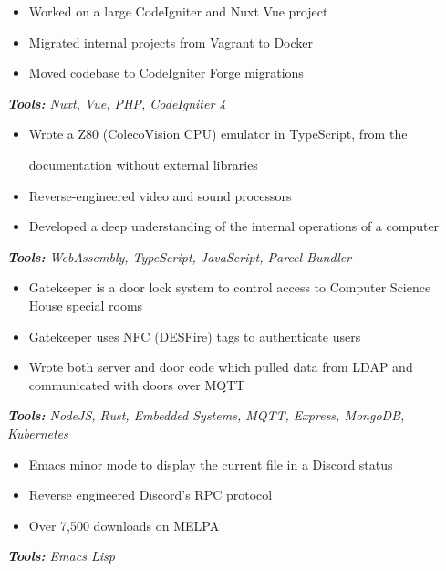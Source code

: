 \documentclass[10pt,letter]{altacv}
\begin{document}
\divider

\begin{itemize}
  \item Worked on a large CodeIgniter and Nuxt Vue project
  \item Migrated internal projects from Vagrant to Docker
  \item Moved codebase to CodeIgniter Forge migrations
\end{itemize}
\textit{\textbf{Tools:} Nuxt, Vue, PHP, CodeIgniter 4}

\smallskip


\smallskip

\begin{itemize}
\item Wrote a Z80 (ColecoVision CPU) emulator in TypeScript, from the

  documentation without external libraries
\item Reverse-engineered video and sound processors
\item Developed a deep understanding of the internal operations of a computer
\end{itemize}
\textit{\textbf{Tools:} WebAssembly, TypeScript, JavaScript, Parcel Bundler}

\divider
  
\begin{itemize}
\item Gatekeeper is a door lock system to control access to Computer Science House special rooms
\item Gatekeeper uses NFC (DESFire) tags to authenticate users
\item Wrote both server and door code which pulled data from LDAP and communicated with doors over MQTT
\end{itemize}
\textit{\textbf{Tools:} NodeJS, Rust, Embedded Systems, MQTT, Express, MongoDB, Kubernetes}

\divider

\begin{itemize}
\item Emacs minor mode to display the current file in a Discord status
\item Reverse engineered Discord's RPC protocol
\item Over 7,500 downloads on MELPA
\end{itemize}
\textit{\textbf{Tools:} Emacs Lisp}

\clearpage
\end{document}
